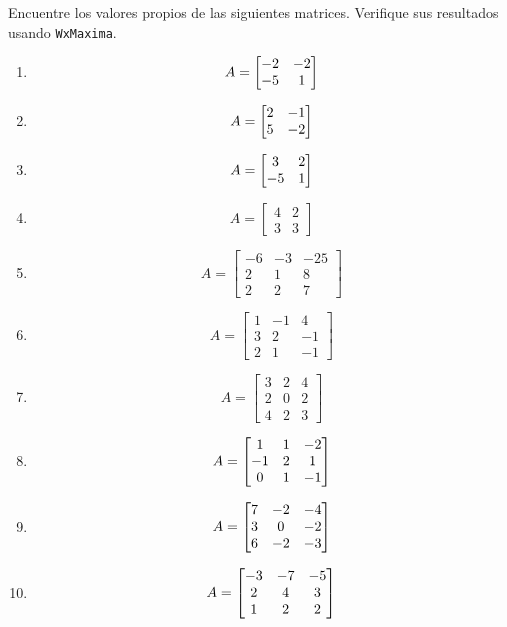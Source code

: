 \begin{resuelto}
\label{exe:diagonal}
 Encuentre los valores propios de las siguientes matrices. Verifique sus resultados usando \texttt{WxMaxima}.
 \begin{enumerate}

 \item $$
A=\begin{bmatrix}-2&-2\\-5&1\end{bmatrix}
 $$

 \item$$A=\begin{bmatrix}2&-1\\5&-2\end{bmatrix}$$

 \item$$A=\begin{bmatrix}3&2\\-5&1\end{bmatrix}$$

 \item $$A=\begin{bmatrix}
            4 & 2 \\
            3 & 3
           \end{bmatrix}
$$

\item$$
A=\begin{bmatrix}
   -6 & -3 & -25 \\
   2 & 1 & 8 \\
   2 & 2 & 7
  \end{bmatrix}
$$

\item $$
A=\begin{bmatrix}
   1 & -1 & 4 \\
   3 & 2 & -1 \\
   2 & 1 & -1
  \end{bmatrix}
$$
\item $$
A=\begin{bmatrix}
   3 & 2 & 4 \\
   2 & 0 & 2 \\
   4 & 2 & 3
  \end{bmatrix}
$$

\item$$A=\begin{bmatrix}1&1&-2\\-1&2&1\\0&1&-1\end{bmatrix}$$

\item$$A=\begin{bmatrix}7&-2&-4\\3&0&-2\\6&-2&-3\end{bmatrix}$$

\item$$A=\begin{bmatrix}-3&-7&-5\\2&4&3\\1&2&2\end{bmatrix}$$
\end{enumerate}
\end{resuelto}



